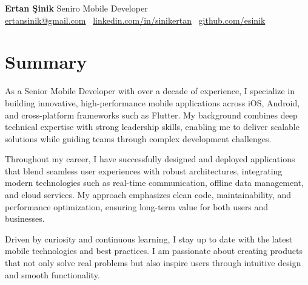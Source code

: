 \documentclass[10pt,a4paper]{extarticle}
\begin{document}
\begin{center}
    \begin{minipage}{\textwidth}
        \centering
        {\LARGE\textbf{Ertan Şinik}} \hspace{2pt} {\LARGE{Seniro Mobile Developer}}\\[10pt]
        \href{mailto:ertansinik@gmail.com}{ertansinik@gmail.com} \textbullet\
        \href{https://linkedin.com/in/sinikertan}{linkedin.com/in/sinikertan} \textbullet\
        \href{https://github.com/esinik}{github.com/esinik}
    \end{minipage}
\end{center}
\section{Summary}
As a Senior Mobile Developer with over a decade of experience, I specialize in building innovative, high-performance mobile applications across iOS, Android, and cross-platform frameworks such as Flutter. My background combines deep technical expertise with strong leadership skills, enabling me to deliver scalable solutions while guiding teams through complex development challenges.

Throughout my career, I have successfully designed and deployed applications that blend seamless user experiences with robust architectures, integrating modern technologies such as real-time communication, offline data management, and cloud services. My approach emphasizes clean code, maintainability, and performance optimization, ensuring long-term value for both users and businesses.

Driven by curiosity and continuous learning, I stay up to date with the latest mobile technologies and best practices. I am passionate about creating products that not only solve real problems but also inspire users through intuitive design and smooth functionality.
\end{document}
